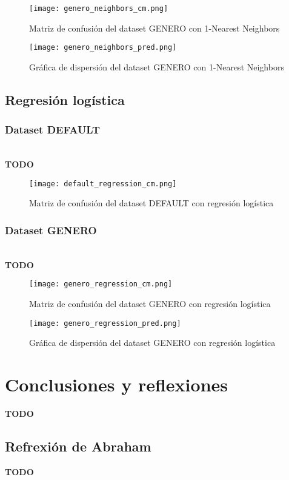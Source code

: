 \documentclass[sigconf,authorversion,nonacm]{acmart}
\begin{document}
\begin{figure}[H]
  \centering
  \texttt{[image: genero\_neighbors\_cm.png]}
  \caption{Matriz de confusión del dataset GENERO con 1-Nearest Neighbors}
\end{figure}

\begin{figure}[H]
  \centering
  \texttt{[image: genero\_neighbors\_pred.png]}
  \caption{Gráfica de dispersión del dataset GENERO con 1-Nearest Neighbors}
\end{figure}

\subsection{Regresión logística}

\subsubsection{Dataset DEFAULT}\hfill\\
\textbf{TODO}

\begin{figure}[H]
  \centering
  \texttt{[image: default\_regression\_cm.png]}
  \caption{Matriz de confusión del dataset DEFAULT con regresión logística}
\end{figure}

\subsubsection{Dataset GENERO}\hfill\\
\textbf{TODO}

\begin{figure}[H]
  \centering
  \texttt{[image: genero\_regression\_cm.png]}
  \caption{Matriz de confusión del dataset GENERO con regresión logística}
\end{figure}

\begin{figure}[H]
  \centering
  \texttt{[image: genero\_regression\_pred.png]}
  \caption{Gráfica de dispersión del dataset GENERO con regresión logística}
\end{figure}

\section{Conclusiones y reflexiones}
\textbf{TODO}

\subsection{Refrexión de Abraham}
\textbf{TODO}
\end{document}
